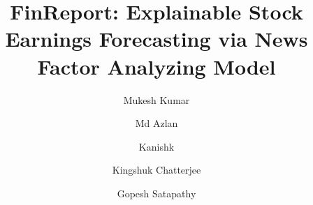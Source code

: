 \documentclass[3p,times,procedia]{elsarticle}
\begin{document}
\begin{frontmatter}




\title{FinReport: Explainable Stock Earnings Forecasting via News Factor Analyzing Model}




\author[a]{Mukesh Kumar}
\author[b]{Md Azlan}
\author[c]{Kanishk}
\author[d]{Kingshuk Chatterjee}
\author[e]{Gopesh Satapathy}

\address[a]{School of Computer Engineering, Kalinga Institute of Industrial Technology, Bhubaneswar-751024, India}
\address[b]{School of Computer Engineering, Kalinga Institute of Industrial Technology, Bhubaneswar-751024, India}
\address[c]{School of Computer Engineering, Kalinga Institute of Industrial Technology, Bhubaneswar-751024, India}
\address[d]{School of Computer Engineering, Kalinga Institute of Industrial Technology, Bhubaneswar-751024, India}
\address[e]{School of Computer Engineering, Kalinga Institute of Industrial Technology, Bhubaneswar-751024, India}




\end{frontmatter}
\end{document}
